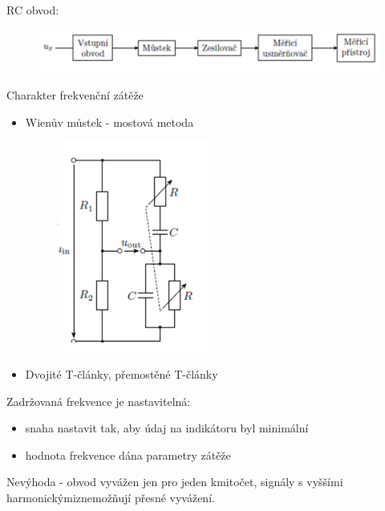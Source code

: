 RC obvod:
\begin{figure}[H]
    \includegraphics*[scale = 1.3]{images/RCObvod.png}
\end{figure}
Charakter frekvenční zátěže
\begin{itemize}
    \item Wienův můstek - mostová metoda
    \begin{figure}[H]
        \includegraphics*[scale = 1.2]{images/wienuvMustek.png}
    \end{figure}
    \item Dvojité T-články, přemostěné T-články
\end{itemize}
Zadržovaná frekvence je nastavitelná:
\begin{itemize}
    \item snaha nastavit tak, aby údaj na indikátoru byl minimální
    \item hodnota frekvence dána parametry zátěže 
\end{itemize}
Nevýhoda - obvod vyvážen jen pro jeden kmitočet, signály s vyššími harmonickýmiznemožňují přesné vyvážení.\\
\newpage

